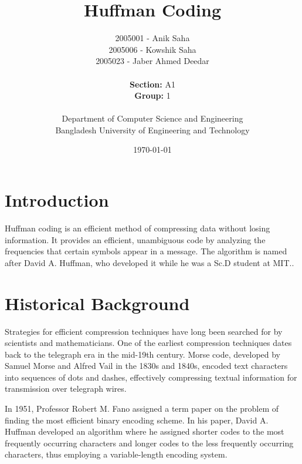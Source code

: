 \documentclass[18pt]{article}
\title{\textbf{Huffman Coding}}
\author{
	2005001 - Anik Saha\\
	2005006 - Kowshik Saha\\
	2005023 - Jaber Ahmed Deedar \\ \\
	\textbf{Section:} A1\\
	\textbf{Group:} 1\\ \\
	Department of Computer Science and Engineering\\
	Bangladesh University of Engineering and Technology\\
}
\date{\today}
\begin{document}
	\maketitle
	\pagebreak
	
	\setlength{\parskip}{0.5em}
	
	\tableofcontents
	
	\setlength{\parskip}{1em}
	\newpage
	
	\listoffigures
	\newpage
	
	\listoftables
	\newpage
	
\newpage

\section{Introduction}	

Huffman coding is an efficient method of compressing data without
losing information. It provides an efficient, unambiguous code by
analyzing the frequencies that certain symbols appear in a message.
The algorithm is named after David A. Huffman, who developed it
while he was a Sc.D student at MIT..

\section{Historical Background}

Strategies for efficient compression techniques have long been searched for by scientists and mathematicians. One of the earliest compression techniques dates back to the telegraph era in the mid-19th century. Morse code, developed by Samuel Morse and Alfred Vail in the 1830s and 1840s, encoded text characters into sequences of dots and dashes, effectively compressing textual information for transmission over telegraph wires. 

In 1951, Professor Robert M. Fano assigned a term paper on the problem of
finding the most efficient binary encoding scheme. In his paper, David A. Huffman
developed an algorithm where he assigned shorter codes to the most
frequently occurring characters and longer codes to the less frequently
occurring characters, thus employing a variable-length encoding system.
\end{document}
